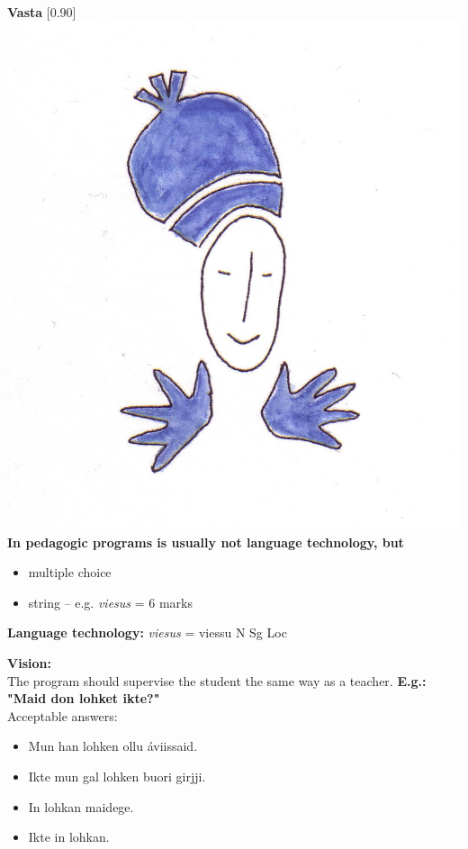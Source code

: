 \documentclass[landscape,norsk,11pt]{seminar}
\begin{document}
\begin{slide}
\newslide
\textbf{Vasta}
\scalebox{0.90}[0.90]{\includegraphics{img/vasta.png}} \\


\newslide
\textbf{In pedagogic programs is usually not language technology, but} 
\begin{itemize}
\item multiple choice 
\item string -- e.g. \textit{viesus} = 6 marks 
\end{itemize}

\textbf{Language technology:} \textit{viesus} = viessu N Sg Loc 


\newslide
\textbf{Vision:}\\
The program should supervise the student the same way as a teacher.
\newslide
\textbf{E.g.: "Maid don lohket ikte?"} \\
Acceptable answers:
\begin{itemize}
\item Mun han lohken ollu \'aviissaid. 
\item Ikte mun gal lohken buori girjji. 
\item In lohkan maidege. 
\item Ikte in lohkan.
\end{itemize}


\end{slide}
\end{document}

